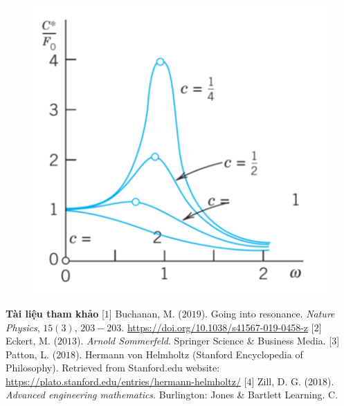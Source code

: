 \begin{multicols}{2}
	\begin{figure}[H]
		\centering
		\vspace*{-5pt}
		\captionsetup{labelformat= empty, justification=centering}
		\includegraphics[width=1\linewidth]{13}
		\vspace*{-15pt}
	\end{figure}
	\textbf{\color{timhieukhoahoc}Tài liệu tham khảo}
	\vskip 0.1cm
	[$1$] Buchanan, M. ($2019$). Going into resonance. \textit{Nature Physics}, $15(3)$, $203-203$. \url{https://doi.org/10.1038/s41567-019-0458-z}
	\vskip 0.1cm
	[$2$] Eckert, M. ($2013$). \textit{Arnold Sommerfeld}. Springer Science \& Business Media.
	\vskip 0.1cm
	[$3$] Patton, L. ($2018$). Hermann von Helmholtz (Stanford Encyclopedia of Philosophy). Retrieved from Stanford.edu website: \url{https://plato.stanford.edu/entries/hermann-helmholtz/}
	\vskip 0.1cm
	[$4$] Zill, D. G. ($2018$). \textit{Advanced engineering mathematics}. Burlington: Jones \& Bartlett Learning. C.
\end{multicols}



